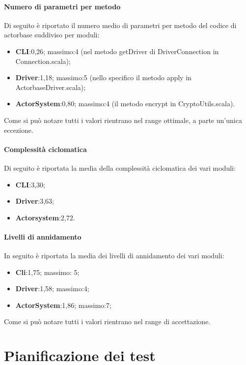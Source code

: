 \documentclass{scalatekids-article}
\begin{document}
	\paragraph{Numero di parametri per metodo}
	Di seguito è riportato il numero medio di parametri per
	metodo del codice di actorbase suddiviso per moduli:
	\begin{itemize}
		\item \textbf{CLI}:0,26; massimo:4 (nel metodo getDriver di  DriverConnection in Connection.scala);
		\item \textbf{Driver}:1,18; massimo:5 (nello specifico il metodo apply in ActorbaseDriver.scala);
		\item \textbf{ActorSystem}:0,80; massimo:4 (il metodo encrypt in CryptoUtils.scala).
	\end{itemize}
	Come si può notare tutti i valori rientrano nel range ottimale, a parte un'unica eccezione.
	
	
	\paragraph{Complessità ciclomatica}
	Di seguito è riportata la media della complessità ciclomatica dei vari moduli:
	\begin{itemize}
		\item \textbf{CLI}:3,30;
		\item \textbf{Driver}:3,63;
		\item \textbf{Actorsystem}:2,72.
	\end{itemize}
	
	\paragraph{Livelli di annidamento}
	In seguito è riportata la media dei livelli di annidamento dei vari moduli:
	\begin{itemize}
		\item \textbf{Cli}:1,75; massimo: 5;
		\item \textbf{Driver}:1,58; massimo:4;
		\item \textbf{ActorSystem}:1,86; massimo:7;
	\end{itemize}
	Come si può notare tutti i valori rientrano nel range di accettazione.

\newpage

\section{Pianificazione dei test}
\end{document}
